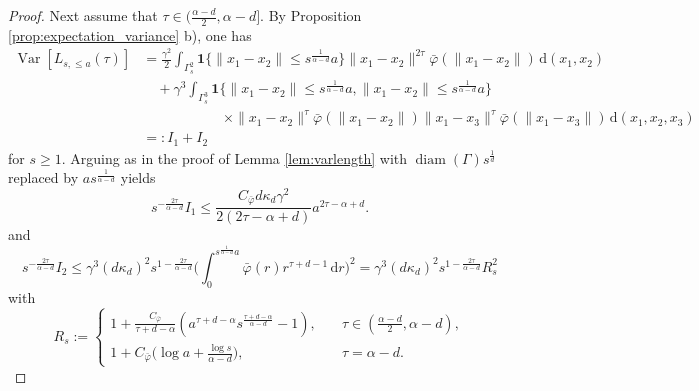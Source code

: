 \documentclass{article}
\theoremstyle{definition}
\numberwithin{equation}{section}
\theoremstyle{remark}
\begin{document}
\begin{proof}
Next assume that $\tau\in(\frac{\alpha-d}{2},\alpha-d]$. By Proposition \ref{prop:expectation_variance} b), one has
\begin{align*}
\operatorname{Var}[L_{s,\leq a}(\tau)] & = \frac{\gamma^2}{2} \int_{\Gamma_s^2} \mathbf{1}\big\{\|x_1-x_2\|\leq s^{\frac{1}{\alpha-d}}a\big\} \|x_1-x_2\|^{2\tau} \bar{\varphi}(\|x_1-x_2\|) \, \mathrm{d}(x_1,x_2) \\
& \quad + \gamma^3 \int_{\Gamma_s^3} \mathbf{1}\big\{\|x_1-x_2\|\leq s^{\frac{1}{\alpha-d}}a, \|x_1-x_2\|\leq s^{\frac{1}{\alpha-d}}a\big\} \\
& \hspace{2cm} \quad \times \|x_1-x_2\|^{\tau} \bar{\varphi}(\|x_1-x_2\|) \|x_1-x_3\|^{\tau} \bar{\varphi}(\|x_1-x_3\|)  \, \mathrm{d}(x_1,x_2,x_3) \\
& =: I_1 + I_2
\end{align*}
for $s\geq 1$. Arguing as in the proof of Lemma \ref{lem:varlength} with $\operatorname{diam}(\Gamma)s^{\frac{1}{d}}$ replaced by $a s^{\frac{1}{\alpha-d}}$ yields 
$$
s^{-\frac{2\tau}{\alpha-d}}I_1 \leq \frac{C_{\bar{\varphi}}d\kappa_d\gamma^2 }{2(2\tau-\alpha+d)} a^{2\tau-\alpha+d}.
$$
and
$$
s^{-\frac{2\tau}{\alpha-d}}I_2 \leq \gamma^3 (d\kappa_d)^2 s^{1-\frac{2\tau}{\alpha-d}} \bigg( \int_0^{s^{\frac{1}{\alpha-d}}a} \bar{\varphi}(r) r^{\tau+d-1} \, \mathrm{d}r \bigg)^2 = \gamma^3 (d\kappa_d)^2 s^{1-\frac{2\tau}{\alpha-d}} R_s^2
$$
with
$$
R_s := \begin{cases} 1 + \frac{C_{\bar{\varphi}}}{\tau+d-\alpha} (a^{\tau+d-\alpha} s^{\frac{\tau+d-\alpha}{\alpha-d}}-1), & \quad \tau\in(\frac{\alpha-d}{2},\alpha-d), \\ 1+C_{\bar{\varphi}}\big( \log a + \frac{\log s}{\alpha-d}\big), & \quad \tau=\alpha-d.\end{cases}
$$


\end{proof}
\end{document}
